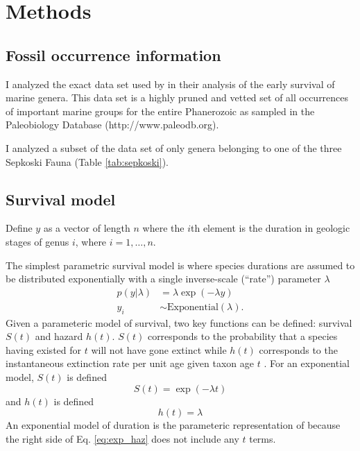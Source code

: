 \documentclass[12pt,letterpaper]{article}
\begin{document}
\section{Methods}

\subsection{Fossil occurrence information}
I analyzed the exact data set used by \citet{Foote2013} in their analysis of the early survival of marine genera. This data set is a highly pruned and vetted set of all occurrences of important marine groups for the entire Phanerozoic as sampled in the Paleobiology Database (http://www.paleodb.org).

I analyzed a subset of the \citet{Foote2013} data set of only genera belonging to one of the three Sepkoski Fauna (Table \ref{tab:sepkoski}).

\subsection{Survival model}
Define \(y\) as a vector of length \(n\) where the \(i\)th element is the duration in geologic stages of genus \(i\), where \(i = 1, \dots, n\).

The simplest parametric survival model is where species durations are assumed to be distributed exponentially with a single inverse-scale (``rate'') parameter \(\lambda\)
\begin{equation}
  \begin{aligned}
    p(y | \lambda) &= \lambda \exp(-\lambda y) \nonumber \\
    y_{i} &\sim \mathrm{Exponential}(\lambda).
  \end{aligned}
  \label{eq:exp}
\end{equation}
Given a parameteric model of survival, two key functions can be defined: survival \(S(t)\) and hazard \(h(t)\). \(S(t)\) corresponds to the probability that a species having existed for \(t\) will not have gone extinct while \(h(t)\) corresponds to the instantaneous extinction rate per unit age given taxon age \(t\) \citep{Klein2003}. For an exponential model, \(S(t)\) is defined
\begin{equation}
  S(t) = \exp(-\lambda t)
  \label{eq:exp_surv}
\end{equation}
and \(h(t)\) is defined
\begin{equation}
  h(t) = \lambda
  \label{eq:exp_haz}
\end{equation}
An exponential model of duration is the parameteric representation of \citet{VanValen1973} because the right side of Eq. \ref{eq:exp_haz} does not include any \(t\) terms.
\end{document}
